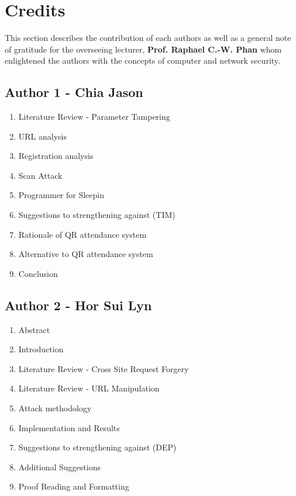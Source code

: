 \documentclass[runningheads]{llncs}
\begin{document}
\clearpage{}

\section{Credits}
This section describes the contribution of each authors as well as a general note of gratitude for the overseeing lecturer, \textbf{Prof. Raphael C.-W. Phan} whom enlightened the authors with the concepts of computer and network security.

\subsection{Author 1 - Chia Jason}
\begin{enumerate}
    \item Literature Review - Parameter Tampering
    \item URL analysis
    \item Registration analysis
    \item Scan Attack
    \item Programmer for Sleepin
    \item Suggestions to strengthening against (TIM)
    \item Rationale of QR attendance system
    \item Alternative to QR attendance system
    \item Conclusion
\end{enumerate}

\subsection{Author 2 - Hor Sui Lyn}
\begin{enumerate}
    \item Abstract
    \item Introduction
    \item Literature Review - Cross Site Request Forgery
    \item Literature Review - URL Manipulation
    \item Attack methodology
    \item Implementation and Results
    \item Suggestions to strengthening against (DEP)
    \item Additional Suggestions
    \item Proof Reading and Formatting
\end{enumerate}

\clearpage{}
%
%
%




\end{document}

